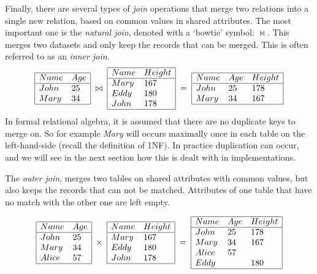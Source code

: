 Finally, there are several types of \emph{join} operations that merge two
relations into a single new relation, based on common values in shared
attributes. The most important one is the \emph{natural join}, denoted
with a `bowtie' symbol: $\bowtie$. This merges two
datasets and only keep the records that can be merged.  This is often referred
to as an \emph{inner join}.
$$
\begin{array}{|ll|}
\hline
Name & Age\\
\hline
John & 25\\
Mary & 34\\
\hline
\end{array}
\;\bowtie\;
\begin{array}{|ll|}
\hline
Name & Height\\
\hline
Mary & 167\\
Eddy & 180\\
John & 178\\
\hline
\end{array}
\;=\;
\begin{array}{|lll|}
\hline
Name & Age & Height\\
\hline
John & 25 & 178\\
Mary & 34 & 167\\
\hline
\end{array}
$$
In formal relational algebra, it is assumed that there are no duplicate keys to
merge on. So for example \emph{Mary} will occurs maximally once in each table
on the left-hand-side (recall the definition of 1NF). In practice duplication
can occur, and we will see in the next section how this is dealt with in
implementations.

The \emph{outer join}, merges two tables on shared attributes with common
values, but also keeps the records that can not be matched. Attributes
of one table that have no match with the other one are left empty.

$$
\begin{array}{|ll|}
\hline
Name & Age\\
\hline
John  & 25\\
Mary  & 34\\
Alice & 57\\
\hline
\end{array}
\;\times\;
\begin{array}{|ll|}
\hline
Name & Height\\
\hline
Mary & 167\\
Eddy & 180\\
John & 178\\
\hline
\end{array}
\;=\;
\begin{array}{|lll|}
\hline
Name & Age & Height\\
\hline
John & 25 & 178 \\
Mary & 34 & 167 \\
Alice& 57 &     \\
Eddy &    & 180 \\
\hline
\end{array}
$$

